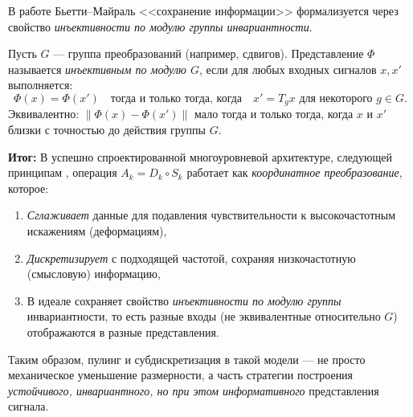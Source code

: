 \documentclass[../NDCNNAI_main.tex]{subfiles}
\begin{document}
В работе Бьетти--Майраль <<сохранение информации>> формализуется через свойство \emph{инъективности по модулю группы инвариантности}.
\begin{definition}
\label{def:injective_modulo_group}
Пусть \(G\) --- группа преобразований (например, сдвигов). Представление \(\Phi\) называется \emph{инъективным по модулю \(G\)}, если для любых входных сигналов \(x, x'\) выполняется:
\[
\Phi(x) = \Phi(x') \quad \text{тогда и только тогда, когда} \quad x' = T_g x \text{ для некоторого } g \in G.
\]
Эквивалентно: \(\|\Phi(x) - \Phi(x')\|\) мало тогда и только тогда, когда \(x\) и \(x'\) близки с точностью до действия группы \(G\).
\end{definition}

\textbf{Итог:} В успешно спроектированной многоуровневой архитектуре, следующей принципам \cite{Bietti_Group}, операция \(A_k = D_k \circ S_k\) работает как \emph{координатное преобразование}, которое:
\begin{enumerate}[label=\arabic*)]
    \item \emph{Сглаживает} данные для подавления чувствительности к высокочастотным искажениям (деформациям),
    \item \emph{Дискретизирует} с подходящей частотой, сохраняя низкочастотную (смысловую) информацию,
    \item В идеале сохраняет свойство \emph{инъективности по модулю группы} инвариантности, то есть разные входы (не эквивалентные относительно \(G\)) отображаются в разные представления.
\end{enumerate}
Таким образом, пулинг и субдискретизация в такой модели --- не просто механическое уменьшение размерности, а часть стратегии построения \emph{устойчивого, инвариантного, но при этом информативного} представления сигнала.
\end{document}
